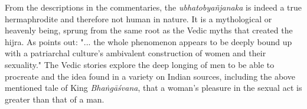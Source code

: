 From the descriptions in the commentaries, the {\em ubhatob­yañ­janaka} is indeed a true hermaphrodite and therefore not human in nature. It is a mythological or heavenly being, sprung from the same root as the Vedic myths that created the hijra. As \cite{goldman} points out: "... the whole phenomenon appears to be deeply bound up with a patriarchal culture's ambivalent construction of women and their sexuality."
The Vedic stories explore the deep longing of men to be able to procreate and the idea found in a variety on Indian sources, including the above mentioned tale of King {\em Bhaṅgāśvana}, that a woman's pleasure in the sexual act is greater than that of a man.

